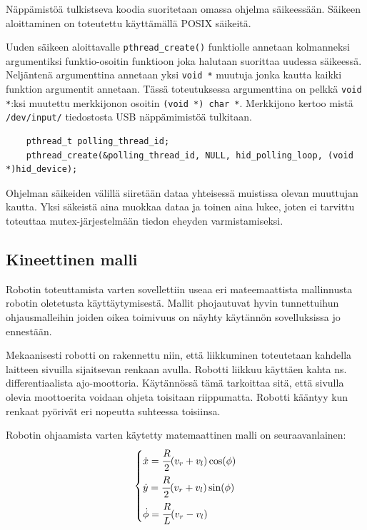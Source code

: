 \documentclass[]{article} %
\numberwithin{equation}{section}
\numberwithin{figure}{section}
\numberwithin{table}{section}
\begin{document}
Näppämistöä tulkistseva koodia suoritetaan omassa ohjelma säikeessään. Säikeen aloittaminen on toteutettu käyttämällä POSIX säikeitä.

Uuden säikeen aloittavalle \verb+pthread_create()+ funktiolle annetaan kolmanneksi argumentiksi funktio-osoitin funktioon joka halutaan suorittaa uudessa säikeessä. Neljäntenä argumenttina annetaan yksi \verb+void *+ muutuja jonka kautta kaikki funktion argumentit annetaan. Tässä toteutuksessa argumenttina on pelkkä \verb+void *+:ksi muutettu merkkijonon osoitin \verb+(void *) char *+. Merkkijono kertoo mistä \verb+/dev/input/+ tiedostosta USB näppämimistöä tulkitaan.

\begin{verbatim}
    pthread_t polling_thread_id;
    pthread_create(&polling_thread_id, NULL, hid_polling_loop, (void *)hid_device);
\end{verbatim}

Ohjelman säikeiden välillä siiretään dataa yhteisessä muistissa olevan muuttujan kautta. Yksi säkeistä aina muokkaa dataa ja toinen aina lukee, joten ei tarvittu toteuttaa mutex-järjestelmään tiedon eheyden varmistamiseksi.


 

\subsection{Kineettinen malli}
\label{sub:Kineettinen malli}

Robotin toteuttamista varten sovellettiin useaa eri mateemaattista mallinnusta robotin oletetusta käyttäytymisestä.
Mallit phojautuvat hyvin tunnettuihun ohjausmalleihin joiden oikea toimivuus on näyhty käytännön sovelluksissa jo ennestään.

Mekaanisesti robotti on rakennettu niin, että liikkuminen toteutetaan kahdella laitteen sivuilla sijaitsevan renkaan avulla.
Robotti liikkuu käyttäen kahta ns. differentiaalista ajo-moottoria.
Käytännössä tämä tarkoittaa sitä, että sivulla olevia moottoerita voidaan ohjeta toisitaan riippumatta.
Robotti kääntyy kun renkaat pyörivät eri nopeutta suhteessa toisiinsa.

Robotin ohjaamista varten käytetty matemaattinen malli on seuraavanlainen:
\begin{align}
    \label{equ:diff-drive-implementation}
    \begin{dcases}
        \dot x = \cfrac{R}{2} (v_r + v_l) \cos (\phi)\\
        \dot y = \cfrac{R}{2} (v_r + v_l) \sin (\phi)\\
        \dot \phi = \cfrac{R}{L} (v_r - v_l)   
    \end{dcases}
\end{align}
\end{document}
